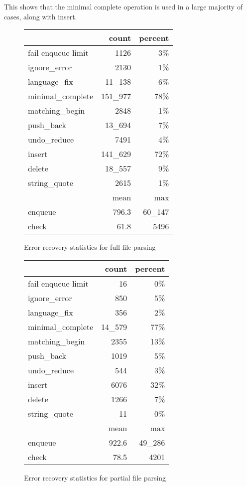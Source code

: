 \documentclass{article}
\begin{document}
This shows that the minimal complete operation is used in a large
majority of cases, along with insert.

\begin{figure}[H]
\begin{tabular}{| l | r | r |}
\hline
                   & count    & percent \\
\hline
fail enqueue limit & 1126     & 3\%     \\
\hline
ignore\_error      & 2130     & 1\%     \\
language\_fix      & 11\_138  & 6\%     \\
minimal\_complete  & 151\_977 & 78\%    \\
matching\_begin    & 2848     & 1\%     \\
push\_back         & 13\_694  & 7\%     \\
undo\_reduce       & 7491     & 4\%     \\
insert             & 141\_629 & 72\%    \\
delete             & 18\_557  & 9\%     \\
string\_quote      & 2615     & 1\%     \\
\hline
\hline
                   & mean     & max     \\
\hline
enqueue            & 796.3    & 60\_147 \\
check              & 61.8     & 5496    \\
\hline
\end{tabular}
\caption{Error recovery statistics for full file parsing}
\label{table:full-recover-stats}
\end{figure}

\begin{figure}[H]
\begin{tabular}{| l | r | r |}
\hline
                   & count    & percent \\
\hline
fail enqueue limit & 16      & 0\%      \\
\hline
ignore\_error      & 850     & 5\%     \\
language\_fix      & 356     & 2\%     \\
minimal\_complete  & 14\_579 & 77\%    \\
matching\_begin    & 2355    & 13\%    \\
push\_back         & 1019    & 5\%     \\
undo\_reduce       & 544     & 3\%     \\
insert             & 6076    & 32\%    \\
delete             & 1266    & 7\%     \\
string\_quote      & 11      & 0\%     \\
\hline
\hline
                   & mean    & max     \\
\hline
enqueue            & 922.6   & 49\_286 \\
check              & 78.5    & 4201    \\
\hline
\end{tabular}
\caption{Error recovery statistics for partial file parsing}
\label{table:partial-recover-stats}
\end{figure}
\end{document}

